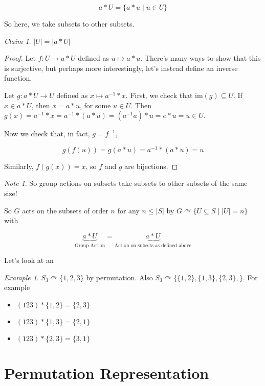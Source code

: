 \documentclass[12pt]{article}
\def\acts{\curvearrowright} %
\def\im{\text{im}}
\theoremstyle{remark}
\theoremstyle{remark}
\newtheorem{claim}{Claim}
\theoremstyle{remark}
\newtheorem{example}{Example}
\theoremstyle{remark}
\theoremstyle{remark}
\newtheorem*{note}{Note}
\begin{document}
\[
  a * U = \{a * u \mid u \in U \}
\]

So here, we take subsets to other subsets.

\begin{claim}
  $|U| = |a * U|$
\end{claim}

\begin{proof}
  Let $f: U \to a * U$ defined as $u \mapsto a * u$. There's many
  ways to show that this is surjective, but perhaps more interestingly, let's
  instead define an inverse function.

  Let $g: a * U \to U$ defined as $x \mapsto a^{-1} * x$. First, we check that
  $\im(g) \subseteq U$. If $x \in a * U$, then $x = a * u$, for some $u \in U$.
  Then $g(x) = a^{-1} * x = a^{-1} * (a * u) = (a^{-1}a) * u = e * u = u \in U$.

  Now we check that, in fact, $g = f^{-1}$,

  \[
    g(f(u)) = g(a * u) = a^{-1} * (a * u) = u
  \]

  Similarly, $f(g(x)) = x$, so $f$ and $g$ are bijections.
\end{proof}

\begin{note}
  So group actions on subsets take subsets to other subsets of the same size!
\end{note}

So $G$ acts on the subsets of order $n$ for any $n \le |S|$ by $G \acts \{U
\subseteq S \mid |U| = n \}$ with

\[
  \underbrace{a * U}_{\text{Group Action}} = \underbrace{a * U}_{\text{Action on subsets as defined above}}
\]

Let's look at an

\begin{example}
  $S_3 \acts \{1, 2, 3\}$ by permutation. Also $S_3 \acts \{\{1, 2\}, \{1, 3\},
  \{2, 3\},\}$. For example

  \begin{itemize}
    \item $(123) * \{1, 2\} = \{2, 3\}$
    \item $(123) * \{1, 3\} = \{2, 1\}$
    \item $(123) * \{2, 3\} = \{3, 1\}$
  \end{itemize}
\end{example}

\section{Permutation Representation}
\end{document}
